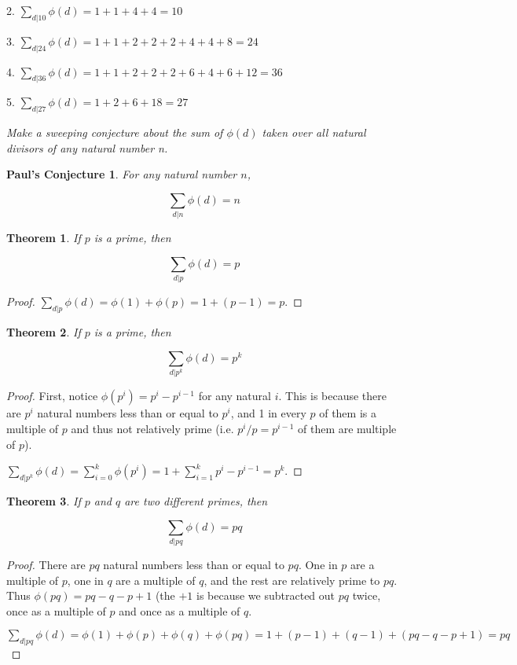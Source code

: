 \documentclass{article}
\newtheorem{thm}{Theorem}[section]
\newtheorem{PC}{Paul's Conjecture}
\numberwithin{equation}{thm}
\begin{document}
2. $\sum_{d|10} \phi(d) = 1 + 1 + 4 + 4 = 10$

3. $\sum_{d|24} \phi(d) = 1 + 1 + 2 + 2 + 2 + 4 + 4 + 8 = 24$

4. $\sum_{d|36} \phi(d) = 1 + 1 + 2 + 2 + 2 + 6 + 4 + 6 + 12 = 36$

5. $\sum_{d|27} \phi(d) = 1 + 2 + 6 + 18 = 27$

\emph{Make a sweeping conjecture about the sum of $\phi(d)$ taken over all natural divisors of any natural number n.}

\begin{PC} \label{PC 6.18}
  For any natural number $n$,

  $$\sum_{d | n} \phi(d) = n$$
\end{PC}



\begin{thm} \label{6.11}
  If $p$ is a prime, then

  $$\sum_{d|p} \phi(d) = p$$
\end{thm}

\begin{proof}
  $\sum_{d|p} \phi(d) = \phi(1) + \phi(p) = 1 + (p-1) = p$.
\end{proof}



\begin{thm} \label{6.12}
  If $p$ is a prime, then

  $$\sum_{d|p^k} \phi(d) = p^k$$
\end{thm}

\begin{proof}
  First, notice $\phi(p^i) = p^i - p^{i-1}$ for any natural $i$. This is because there are $p^i$ natural numbers less than or equal to $p^i$, and 1 in every $p$ of them is a multiple of $p$ and thus not relatively prime (i.e. $p^{i} / p = p^{i-1}$ of them are multiple of $p$).

  $\sum_{d|p^k} \phi(d) = \sum_{i=0}^k \phi(p^i) = 1 + \sum_{i=1}^k p^i - p^{i-1} = p^k$.
\end{proof}



\begin{thm} \label{6.13}
  If $p$ and $q$ are two different primes, then

  $$\sum_{d|pq} \phi(d) = pq$$
\end{thm}

\begin{proof}
  There are $pq$ natural numbers less than or equal to $pq$. One in $p$ are a multiple of $p$, one in $q$ are a multiple of $q$, and the rest are relatively prime to $pq$. Thus $\phi(pq) = pq - q - p + 1$ (the $+1$ is because we subtracted out $pq$ twice, once as a multiple of $p$ and once as a multiple of $q$.

  $\sum_{d|pq} \phi(d) = \phi(1) + \phi(p) + \phi(q) + \phi(pq) = 1 + (p-1) + (q-1) + (pq - q - p + 1) = pq$
\end{proof}
\end{document}
